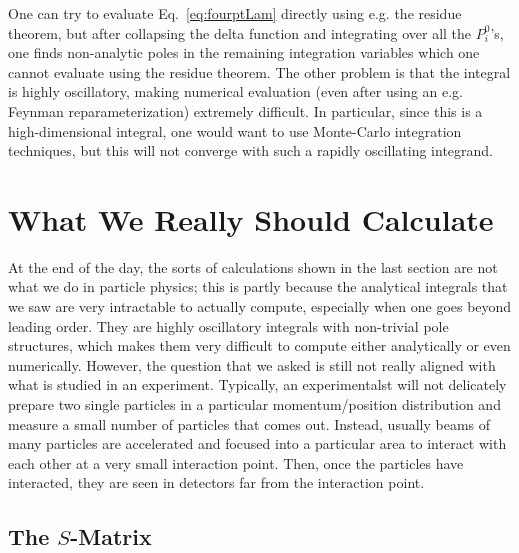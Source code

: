 \documentclass{article}
\numberwithin{equation}{subsection}
\begin{document}
One can try to evaluate Eq.~\eqref{eq:fourptLam} directly using e.g. the residue theorem, but after collapsing the delta function and integrating over
all the $P_i^0$'s, one finds non-analytic poles in the remaining integration variables which one cannot evaluate using the residue theorem. The other
problem is that the integral is highly oscillatory, making numerical evaluation (even after using an e.g. Feynman reparameterization) extremely
difficult. In particular, since this is a high-dimensional integral, one would want to use Monte-Carlo integration techniques, but this will not
converge with such a rapidly oscillating integrand.

\section{What We Really Should Calculate}

At the end of the day, the sorts of calculations shown in the last section are not what we do in particle physics; this is partly because the analytical integrals that
we saw are very intractable to actually compute, especially when one goes beyond leading order. They are highly oscillatory integrals with non-trivial pole structures,
which makes them very difficult to compute either analytically or even numerically. However, the question that we asked is still not really aligned with what is studied
in an experiment. Typically, an experimentalst will not delicately prepare two single particles in a particular momentum/position distribution and measure a small number
of particles that comes out. Instead, usually beams of many particles are accelerated and focused into a particular area to interact with each other at a very small
interaction point. Then, once the particles have interacted, they are seen in detectors far from the interaction point.

\subsection{The $S$-Matrix}
\end{document}
